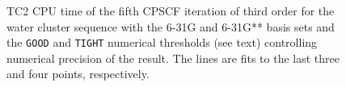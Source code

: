 \documentclass[prl,aps,letterpaper,twocolumn,showpacs,twocolumngrid,superbib]{revtex4}
\begin{document}
\begin{figure}[h]
  \caption{\protect
    TC2 CPU time of the fifth CPSCF iteration of third order for
    the water cluster sequence with the 6-31G and 6-31G** 
    basis sets and the {\tt GOOD} and {\tt TIGHT} 
    numerical thresholds (see text) controlling numerical
    precision of the result. The lines are fits to the 
    last three and four points, respectively.
  }\label{fig:Gamma_TC2R_Timing}
\end{figure}
\end{document}

